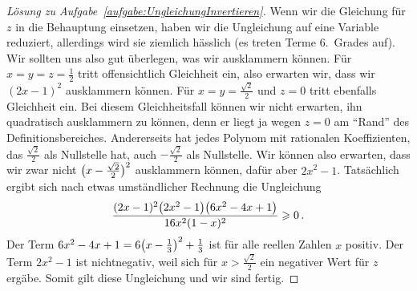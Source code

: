 \begin{proof}[Lösung zu Aufgabe~\ref{aufgabe:UngleichungInvertieren}]
	Wenn wir die Gleichung für $z$ in die Behauptung einsetzen, haben wir die Ungleichung auf eine Variable reduziert, allerdings wird sie ziemlich hässlich (es treten Terme 6.\ Grades auf). Wir sollten uns also gut überlegen, was wir ausklammern können. Für $x=y=z=\frac12$ tritt offensichtlich Gleichheit ein, also erwarten wir, dass wir $(2x-1)^2$ ausklammern können. Für $x=y=\frac{\sqrt{2}}{2}$ und $z=0$ tritt ebenfalls Gleichheit ein. Bei diesem Gleichheitsfall können wir nicht erwarten, ihn quadratisch ausklammern zu können, denn er liegt ja wegen $z=0$ am \enquote{Rand} des Definitionsbereiches. Andererseits hat jedes Polynom mit rationalen Koeffizienten, das $\frac{\sqrt{2}}{2}$ als Nullstelle hat, auch $-\frac{\sqrt{2}}{2}$ als Nullstelle. Wir können also erwarten, dass wir zwar nicht $\parens[\big]{x-\frac{\sqrt{2}}{2}}^2$ ausklammern können, dafür aber $2x^2-1$. Tatsächlich ergibt sich nach etwas umständlicher Rechnung die Ungleichung
	\begin{equation*}
		\frac{(2x-1)^2\parens*{2x^2-1}\parens*{6x^2-4x+1}}{16x^2(1-x)^2}\geqslant 0\,.
	\end{equation*}
	Der Term $6x^2-4x+1=6\parens[\big]{x-\frac13}^2+\frac13$ ist für alle reellen Zahlen $x$ positiv. Der Term $2x^2-1$ ist nichtnegativ, weil sich für $x>\frac{\sqrt{2}}{2}$ ein negativer Wert für $z$ ergäbe. Somit gilt diese Ungleichung und wir sind fertig.
\end{proof}